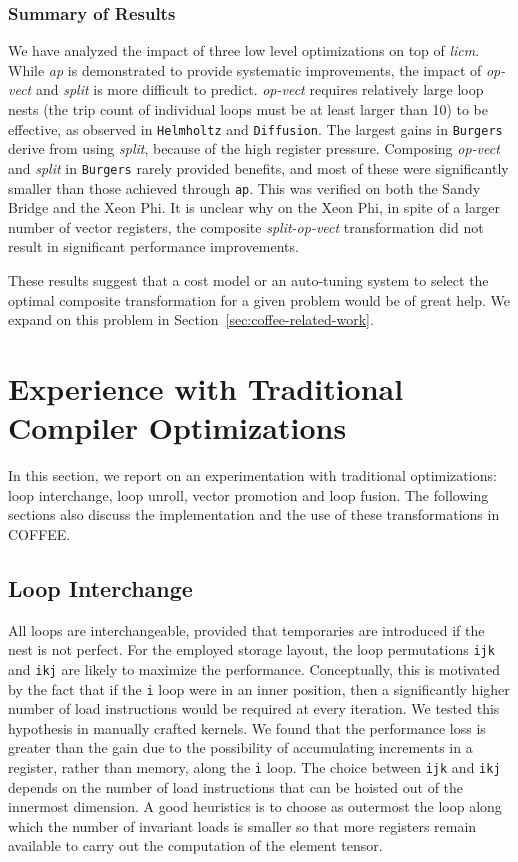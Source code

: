 \subsubsection{Summary of Results}
We have analyzed the impact of three low level optimizations on top of {\em licm}. While {\em ap} is demonstrated to provide systematic improvements, the impact of {\em op-vect} and {\em split} is more difficult to predict. {\em op-vect} requires relatively large loop nests (the trip count of individual loops must be at least larger than 10) to be effective, as observed in {\tt Helmholtz} and {\tt Diffusion}. The largest gains in {\tt Burgers} derive from using {\em split}, because of the high register pressure. Composing {\em op-vect} and {\em split} in {\tt Burgers} rarely provided benefits, and most of these were significantly smaller than those achieved through {\tt ap}. This was verified on both the Sandy Bridge and the Xeon Phi. It is unclear why on the Xeon Phi, in spite of a larger number of vector registers, the composite {\em split-op-vect} transformation did not result in significant performance improvements.

These results suggest that a cost model or an auto-tuning system to select the optimal composite transformation for a given problem would be of great help. We expand on this problem in Section~\ref{sec:coffee-related-work}.

\section{Experience with Traditional Compiler Optimizations}
\label{sec:coffee-genpurp-opts}
In this section, we report on an experimentation with traditional optimizations: loop interchange, loop unroll, vector promotion and loop fusion. The following sections also discuss the implementation and the use of these transformations in COFFEE. 

\subsection{Loop Interchange}
\label{sec:coffee-genpurp-opts-interchange}
All loops are interchangeable, provided that temporaries are introduced if the nest is not perfect. For the employed storage layout, the loop permutations \texttt{ijk} and \texttt{ikj} are likely to maximize the performance. Conceptually, this is motivated by the fact that if the \texttt{i} loop were in an inner position, then a significantly higher number of load instructions would be required at every iteration. We tested this hypothesis in manually crafted kernels. We found that the performance loss is greater than the gain due to the possibility of accumulating increments in a register, rather than memory, along the \texttt{i} loop. The choice between \texttt{ijk} and \texttt{ikj} depends on the number of load instructions that can be hoisted out of the innermost dimension. A good heuristics is to choose as outermost the loop along which the number of invariant loads is smaller so that more registers remain available to carry out the computation of the element tensor. 

